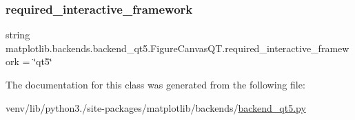 \subsubsection{\texorpdfstring{required\+\_\+interactive\+\_\+framework}{required\_interactive\_framework}}
{\footnotesize\ttfamily string matplotlib.\+backends.\+backend\+\_\+qt5.\+Figure\+Canvas\+Q\+T.\+required\+\_\+interactive\+\_\+framework = \char`\"{}qt5\char`\"{}\hspace{0.3cm}{\ttfamily [static]}}



The documentation for this class was generated from the following file\+:\begin{DoxyCompactItemize}
\item 
venv/lib/python3./site-\/packages/matplotlib/backends/\hyperlink{backend__qt5_8py}{backend\+\_\+qt5.\+py}\end{DoxyCompactItemize}
